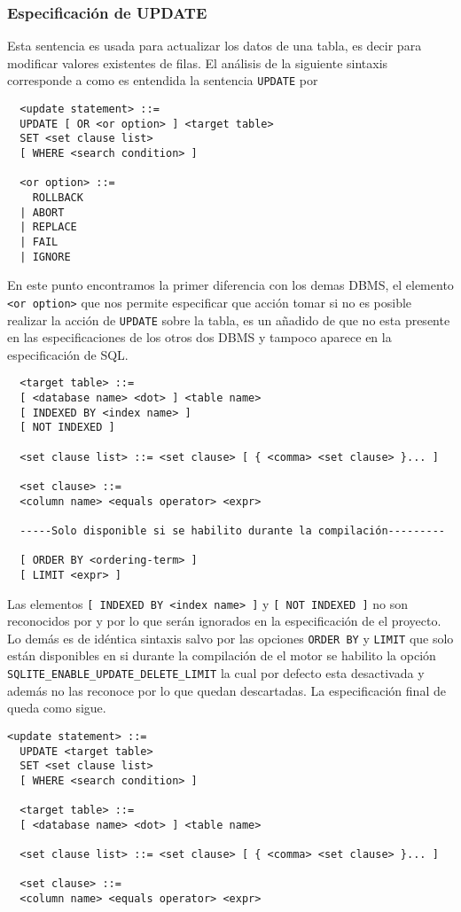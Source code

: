 \subsubsection{Especificación de UPDATE} 
\label{especificacion:dialectos:update}
Esta sentencia es usada para actualizar los datos de una tabla, es decir para modificar valores existentes de filas. El análisis de la siguiente sintaxis corresponde a como es entendida la sentencia \verb=UPDATE= por \s\cite{sqlite:sql} 

\begin{Verbatim}
  <update statement> ::=
  UPDATE [ OR <or option> ] <target table> 
  SET <set clause list>
  [ WHERE <search condition> ]
  
  <or option> ::=
    ROLLBACK
  | ABORT
  | REPLACE
  | FAIL
  | IGNORE
\end{Verbatim}

En este punto encontramos la primer diferencia con los demas DBMS, el elemento \verb=<or option>= que nos permite especificar que acción tomar si no es posible realizar la acción de \verb=UPDATE= sobre la tabla, es un añadido de \s que no esta presente en las especificaciones de los otros dos DBMS y tampoco aparece en la especificación de SQL.

\begin{Verbatim}
  <target table> ::=
  [ <database name> <dot> ] <table name>
  [ INDEXED BY <index name> ]
  [ NOT INDEXED ]
  
  <set clause list> ::= <set clause> [ { <comma> <set clause> }... ]

  <set clause> ::=
  <column name> <equals operator> <expr>
  
  -----Solo disponible si se habilito durante la compilación---------
  
  [ ORDER BY <ordering-term> ]
  [ LIMIT <expr> ]

\end{Verbatim}
Las elementos \verb=[ INDEXED BY <index name> ]= y \verb=[ NOT INDEXED ]= no son reconocidos por \m y \p por lo que serán ignorados en la especificación de el proyecto. Lo demás es de idéntica sintaxis salvo por las opciones \verb=ORDER BY= y \verb=LIMIT= que solo están disponibles en \s si durante la compilación de el motor se habilito la opción \verb=SQLITE_ENABLE_UPDATE_DELETE_LIMIT= la cual por defecto esta desactivada y además \p no las reconoce por lo que quedan descartadas. La especificación final de \jj queda como sigue.

\begin{Verbatim}[frame=single, label=sintaxis para UPDATE]
  <update statement> ::=
  UPDATE <target table> 
  SET <set clause list>
  [ WHERE <search condition> ]
  
  <target table> ::=
  [ <database name> <dot> ] <table name>
  
  <set clause list> ::= <set clause> [ { <comma> <set clause> }... ]

  <set clause> ::=
  <column name> <equals operator> <expr>    
\end{Verbatim}




